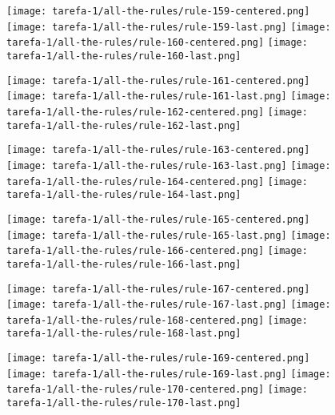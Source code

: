 \begin{figure}[htbp]
  \centering
\texttt{[image: tarefa-1/all-the-rules/rule-159-centered.png]}
\texttt{[image: tarefa-1/all-the-rules/rule-159-last.png]}
\texttt{[image: tarefa-1/all-the-rules/rule-160-centered.png]}
\texttt{[image: tarefa-1/all-the-rules/rule-160-last.png]}
\end{figure}
\begin{figure}[htbp]
  \centering
\texttt{[image: tarefa-1/all-the-rules/rule-161-centered.png]}
\texttt{[image: tarefa-1/all-the-rules/rule-161-last.png]}
\texttt{[image: tarefa-1/all-the-rules/rule-162-centered.png]}
\texttt{[image: tarefa-1/all-the-rules/rule-162-last.png]}
\end{figure}
\begin{figure}[htbp]
  \centering
\texttt{[image: tarefa-1/all-the-rules/rule-163-centered.png]}
\texttt{[image: tarefa-1/all-the-rules/rule-163-last.png]}
\texttt{[image: tarefa-1/all-the-rules/rule-164-centered.png]}
\texttt{[image: tarefa-1/all-the-rules/rule-164-last.png]}
\end{figure}
\begin{figure}[htbp]
  \centering
\texttt{[image: tarefa-1/all-the-rules/rule-165-centered.png]}
\texttt{[image: tarefa-1/all-the-rules/rule-165-last.png]}
\texttt{[image: tarefa-1/all-the-rules/rule-166-centered.png]}
\texttt{[image: tarefa-1/all-the-rules/rule-166-last.png]}
\end{figure}
\begin{figure}[htbp]
  \centering
\texttt{[image: tarefa-1/all-the-rules/rule-167-centered.png]}
\texttt{[image: tarefa-1/all-the-rules/rule-167-last.png]}
\texttt{[image: tarefa-1/all-the-rules/rule-168-centered.png]}
\texttt{[image: tarefa-1/all-the-rules/rule-168-last.png]}
\end{figure}
\begin{figure}[htbp]
  \centering
\texttt{[image: tarefa-1/all-the-rules/rule-169-centered.png]}
\texttt{[image: tarefa-1/all-the-rules/rule-169-last.png]}
\texttt{[image: tarefa-1/all-the-rules/rule-170-centered.png]}
\texttt{[image: tarefa-1/all-the-rules/rule-170-last.png]}
\end{figure}

